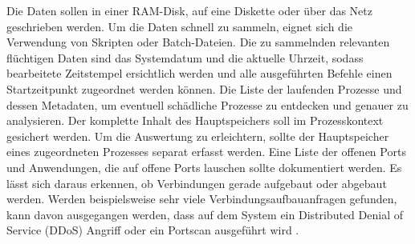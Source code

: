\documentclass[12pt,DIV=14, version=first, BCOR=10mm,a4paper,twoside,parskip=half-,headsepline,headinclude]{scrartcl}
\begin{document}
	    Die Daten sollen in einer RAM-Disk, auf eine Diskette oder über das Netz geschrieben werden. Um die Daten schnell zu sammeln, eignet sich die Verwendung von Skripten oder Batch-Dateien. Die zu sammelnden relevanten flüchtigen Daten sind das Systemdatum und die aktuelle Uhrzeit, sodass bearbeitete Zeitstempel ersichtlich werden und alle ausgeführten Befehle einen Startzeitpunkt zugeordnet werden können. Die Liste der laufenden Prozesse und dessen Metadaten, um eventuell schädliche Prozesse zu entdecken und genauer zu analysieren. Der komplette Inhalt des Hauptspeichers soll im Prozesskontext gesichert werden. Um die Auswertung zu erleichtern, sollte der Hauptspeicher eines zugeordneten Prozesses separat erfasst werden. Eine Liste der offenen Ports und Anwendungen, die auf offene Ports lauschen sollte dokumentiert werden. Es lässt sich daraus erkennen, ob Verbindungen gerade aufgebaut oder abgebaut werden. Werden beispielsweise sehr viele Verbindungsaufbauanfragen gefunden, kann davon ausgegangen werden, dass auf dem System ein Distributed Denial of Service (DDoS) Angriff oder ein Portscan ausgeführt wird \cite[vgl. S. 90]{texbook01}.
	    
\end{document}
